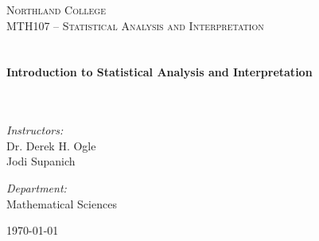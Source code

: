 \dominitoc
\setcounter{minitocdepth}{1} %

\VerbatimFootnotes  %

\begin{titlepage}
\begin{center}

\textsc{\LARGE Northland College}\\[0.5cm]
\textsc{\Large MTH107 -- Statistical Analysis and Interpretation}\\[1.5cm]

\HRuleW \\
\HRule \\[1cm]
{ \huge \bfseries Introduction to Statistical Analysis and Interpretation}\\[1cm]
\HRule \\
\HRuleW \\[1.5cm]

\begin{minipage}{0.4\textwidth}
\begin{flushleft}
  \Large \emph{Instructors:}\\Dr. Derek H. Ogle \\ Jodi Supanich
\end{flushleft}
\end{minipage}
\begin{minipage}{0.4\textwidth}
\begin{flushright}
  \Large \emph{Department:} \\ Mathematical Sciences
\end{flushright}
\end{minipage}

\vfill

{\Large \today}

\end{center}

\end{titlepage}

